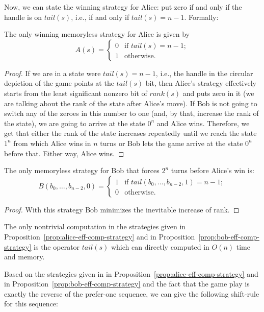 \documentclass[final,12pt]{elsarticle}
\theoremstyle{definition} \newtheorem{definition}[theorem]{Definition} \newtheorem{observation}[theorem]{Observation} \newtheorem{example}[theorem]{Example} \newtheorem{remark}[theorem]{Remark} \newtheorem{corrolary}[theorem]{Corrolary}
\begin{document}
Now, we can state the winning strategy for Alice: put zero if and only if the handle is on $tail(s)$, i.e., if and only if $tail(s)=n-1$. Formally:

\begin{proposition}
	The only winning memoryless strategy for Alice is given by  $$A(s) =
		\begin{cases}
			0 &
			\text{if } tail(s)=n-1; \\
			1 &
			\text{otherwise.}
		\end{cases} $$
		\label{prop:alice-eff-comp-strategy}
\end{proposition}
\begin{proof}
	If we are in a state were $tail(s)=n-1$, i.e., the handle in the circular depiction of the game points at the $tail(s)$ bit, then Alice's strategy effectively starts from the least significant nonzero bit of $rank(s)$ and puts zero in it (we are talking about the rank of the state after Alice's move). If Bob is not going to switch any of the zeroes in this number to one (and, by that, increase the rank of the state), we are going to arrive at the state $0^n$ and Alice wins. Therefore, we get that either the rank of the state increases repeatedly until we reach the state $1^n$ from which Alice wins in $n$ turns or Bob lets the game arrive at the state $0^n$ before that. Either way, Alice wins. 
\end{proof}

\begin{proposition}
	The only memoryless strategy for Bob that forces $2^n$ turns before Alice's win is:
	$$B(b_0,\dots,b_{n-2},0) =
	\begin{cases}
	1 &
	\text{if } tail(b_0,\dots,b_{n-2},1)=n-1; \\
	0 &
	\text{otherwise.}
	\end{cases} $$
	\label{prop:bob-eff-comp-strategy}
\end{proposition}
\begin{proof}
	With this strategy Bob minimizes the inevitable increase of rank. 
\end{proof}

The only nontrivial computation in the strategies given in Proposition~\ref{prop:alice-eff-comp-strategy} and in Proposition~\ref{prop:bob-eff-comp-strategy} is the operator $tail(s)$ which can directly computed in $O(n)$ time and memory. 

Based on the strategies given in  in Proposition~\ref{prop:alice-eff-comp-strategy} and in Proposition~\ref{prop:bob-eff-comp-strategy} and the fact that the game play is exactly the reverse of the prefer-one sequence, we can give the following shift-rule for this sequence:
\end{document}

